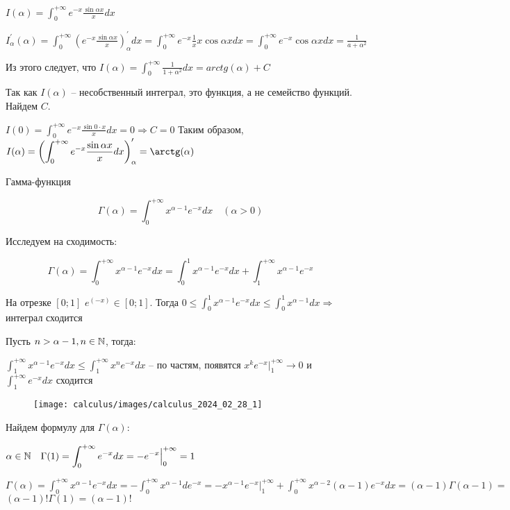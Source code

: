 \documentclass[12pt]{article}
\begin{document}
    \Ex $\displaystyle I(\alpha) = \int^{+\infty}_0 e^{-x} \frac{\sin\alpha x}{x}dx$

    $\displaystyle I^\prime_\alpha(\alpha) = \int^{+\infty}_0 \left(e^{-x} \frac{\sin\alpha x}{x}\right)^\prime_\alpha dx = \int^{+\infty}_0 e^{-x} \frac{1}{x} x \cos\alpha x dx =
    \int^{+\infty}_0 e^{-x} \cos\alpha x dx = \frac{1}{a + \alpha^2}$

    Из этого следует, что $\displaystyle I(\alpha) = \int^{+\infty}_{0} \frac{1}{1 + \alpha^2} dx = arctg(\alpha) + C$

    Так как $I(\alpha)$ -- несобственный интеграл, это функция, а не семейство функций. Найдем $C$.

    $\displaystyle I(0) = \int^{+\infty}_0 e^{-x} \frac{\sin 0 \cdot x}{x}dx = 0 \Longrightarrow C = 0$
    Таким образом, $\displaystyle I(\alpha) = \left(\int^{+\infty}_0 e^{-x} \frac{\sin\alpha x}{x} dx\right)^\prime_\alpha = \arctg(\alpha)$

    \Ex Гамма-функция

    \[\Gamma(\alpha) = \int^{+\infty}_0 x^{\alpha - 1} e^{-x} dx \quad (\alpha > 0)\]

    Исследуем на сходимость:

    \[\Gamma(\alpha) = \int^{+\infty}_0 x^{\alpha - 1} e^{-x} dx = \int^{1}_0 x^{\alpha - 1} e^{-x} dx + \int^{+\infty}_1 x^{\alpha - 1} e^{-x}\]

    На отрезке $[0; 1]$ $e^(-x) \in [0;1]$.
    Тогда $\displaystyle 0 \leq \int^{1}_0 x^{\alpha - 1} e^{-x} dx \leq \int^{1}_0 x^{\alpha - 1} dx \Longrightarrow$ интеграл сходится

    Пусть $n > \alpha - 1, n \in \mathbb{N}$, тогда:

    $\displaystyle \int^{+\infty}_1 x^{\alpha - 1} e^{-x} dx \leq \int^{+\infty}_1 x^{n} e^{-x} dx$ -- по частям, появятся $\displaystyle x^{k} e^{-x} \Big|^{+\infty}_1 \rightarrow 0$ и $\displaystyle \int^{+\infty}_1 e^{-x} dx$ сходится

    \begin{wrapfigure}{r}{0pt}
        \texttt{[image: calculus/images/calculus\_2024\_02\_28\_1]}
    \end{wrapfigure}
    Найдем формулу для $\Gamma(\alpha)$:

    $\displaystyle \alpha \in \mathbb{N} \quad \Gamma(1) = \int^{+\infty}_0 e^{-x} dx = -e^{-x} \Big|^{+\infty}_{0} = 1$

    $\displaystyle \Gamma(\alpha) = \int^{+\infty}_0 x^{\alpha - 1} e^{-x} dx = -\int^{+\infty}_0 x^{\alpha - 1} de^{-x} = -x^{\alpha - 1}e^{-x} \Big|^{+\infty}_1 + \int^{+\infty}_0 x^{\alpha - 2} (\alpha - 1) e^{-x} dx = (\alpha - 1) \Gamma(\alpha - 1) = $
    $(\alpha - 1)! \Gamma(1) = (\alpha - 1)!$
\end{document}

